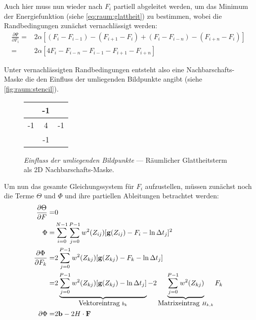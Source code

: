 Auch hier muss nun wieder nach $F_i$ partiell abgeleitet werden, um das Minimum der Energiefunktion (siehe \autoref{eq:raum:glattheit}) zu bestimmen, wobei die Randbedingungen zunächst vernachlässigt werden:
\begin{align}
\label{eq:raum:derivate}
\frac{\partial \Psi}{\partial F_i} =& 2\alpha[(F_i - F_{i-1}) - (F_{i+1} - F_i) + (F_i - F_{i-n})-(F_{i+n}- F_i)]\\
=&2\alpha[4 F_i-F_{i-n} - F_{i-1} - F_{i+1} - F_{i+n}]
\end{align}

Unter vernachlässigten Randbedingungen entsteht also eine Nachbarschafts-Maske die den Einfluss der umliegenden Bildpunkte angibt (siehe \autoref{fig:raum:stencil}). 

\begin{figure}
  \begin{center}
    \begin{tabular}{c|c|c}
        \cline{2-2}
        & -1 & \\
        \hline
        \multicolumn{1}{|c|}{-1}
        & 4 & \multicolumn{1}{c|}{-1}\\
        \hline
        & -1 & \\
        \cline{2-2} 
    \end{tabular}
  \end{center}
\caption{\textit{Einfluss der umliegenden Bildpunkte} --- Räumlicher Glattheitsterm als 2D Nachbarschafts-Maske.}
\label{fig:raum:stencil}
\end{figure}

Um nun das gesamte Gleichungssystem für $F_i$ aufzustellen, müssen zunächst noch die Terme $\Theta$ und $\Phi$ und ihre partiellen Ableitungen betrachtet werden:
\begin{align}
\frac{\partial \Theta}{\partial F} =& 0\\
\Phi =&\sum_{i=0}^{N-1} \sum_{j=0}^{P-1} w^2(Z_{ij})[\mathbf g(Z_{ij}) - F_i - \ln \Delta t_j]^2\\
\frac{\partial \Phi}{\partial F_k} =& 2 \sum_{j=0}^{P-1} w^2(Z_{kj})[\mathbf g(Z_{kj}) -F_k-\ln \Delta t_j]\\
\label{eq:raum:phi}
=& 2 \underbrace{
		\sum_{j=0}^{P-1} w^2(Z_{kj})[\mathbf g(Z_{kj}) -\ln \Delta t_j]
	}_{
		\mbox{Vektoreintrag }b_k
	} 
	- 2 \underbrace{
		\sum_{j=0}^{P-1} w^2(Z_{kj})
	}_{
		\mbox{Matrixeintrag } H_{k,k}
	}
	F_k\\
\label{eq:raum:phi:matrix}
\partial \Phi =& 2 \mathbf b - 2 H \cdot \mathbf F
\end{align}


